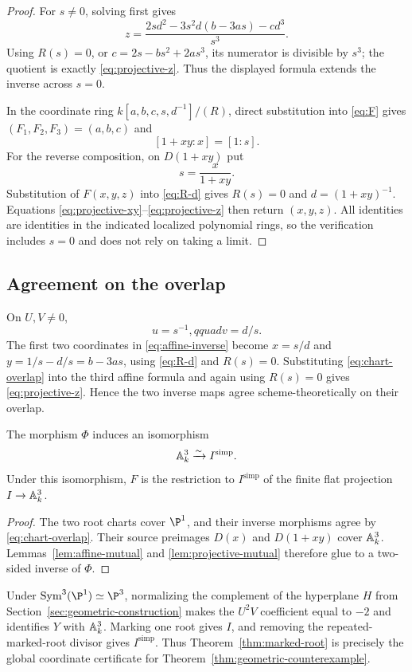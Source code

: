 \begin{proof}
For $s\ne0$, solving first gives
\[
 z=\frac{2sd^2-3s^2d(b-3as)-cd^3}{s^3}.
\]
Using $R(s)=0$, or $c=2s-bs^2+2as^3$, its numerator is divisible by $s^3$;
the quotient is exactly \eqref{eq:projective-z}.  Thus the displayed formula
extends the inverse across $s=0$.

In the coordinate ring $k[a,b,c,s,d^{-1}]/(R)$, direct substitution into
\eqref{eq:F} gives $(F_1,F_2,F_3)=(a,b,c)$ and
\[
 [1+xy:x]=[1:s].
\]
For the reverse composition, on $D(1+xy)$ put
\[
 s=\frac{x}{1+xy}.
\]
Substitution of $F(x,y,z)$ into \eqref{eq:R-d} gives
$R(s)=0$ and $d=(1+xy)^{-1}$.  Equations
\eqref{eq:projective-xy}--\eqref{eq:projective-z} then return $(x,y,z)$.
All identities are identities in the indicated localized polynomial rings,
so the verification includes $s=0$ and does not rely on taking a limit.
\end{proof}

\subsection{Agreement on the overlap}

On $U,V\ne0$,
\begin{equation}\label{eq:chart-overlap}
 u=s^{-1},qquad v=d/s.
\end{equation}
The first two coordinates in \eqref{eq:affine-inverse} become
$x=s/d$ and $y=1/s-d/s=b-3as$, using \eqref{eq:R-d} and $R(s)=0$.
Substituting \eqref{eq:chart-overlap} into the third affine formula and again
using $R(s)=0$ gives \eqref{eq:projective-z}.  Hence the two inverse maps
agree scheme-theoretically on their overlap.

\begin{theorem}\label{thm:marked-root}
The morphism $\Phi$ induces an isomorphism
\[
 \mathbb A^3_k\xrightarrow{\sim}I^{\mathrm{simp}}.
\]
Under this isomorphism, $F$ is the restriction to $I^{\mathrm{simp}}$ of the
finite flat projection $I\to\mathbb A^3_k$.
\end{theorem}

\begin{proof}
The two root charts cover $\P^1$, and their inverse morphisms agree by
\eqref{eq:chart-overlap}.  Their source preimages $D(x)$ and $D(1+xy)$ cover
$\mathbb A^3_k$.  Lemmas~\ref{lem:affine-mutual} and
\ref{lem:projective-mutual} therefore glue to a two-sided inverse of $\Phi$.
\end{proof}

Under $\operatorname{Sym}^3(\P^1)\simeq\P^3$, normalizing the complement of
the hyperplane $H$ from Section~\ref{sec:geometric-construction} makes the
$U^2V$ coefficient equal to $-2$ and identifies $Y$ with $\mathbb A^3_k$.  Marking
one root gives $I$, and removing the repeated-marked-root divisor gives
$I^{\mathrm{simp}}$.  Thus Theorem~\ref{thm:marked-root} is precisely the
global coordinate certificate for Theorem~\ref{thm:geometric-counterexample}.
